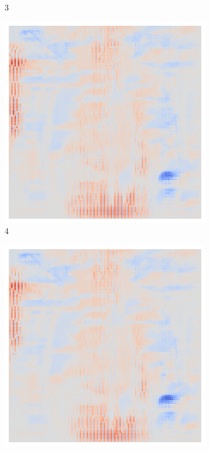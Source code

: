 \begin{figure}[ht!]
\begin{subfigure}{0.095\linewidth}
        \caption{3}
    \end{subfigure}\hfill%
    \begin{subfigure}{0.095\linewidth}
        \centering
        \includegraphics[height=1\linewidth]{01-images/05-resultate/uap_efficientnet/uap0-efficientnetv2m-covid-n200-robustificationslevel4.png}
        \caption{4}
    \end{subfigure}\hfill%
    \begin{subfigure}{0.095\linewidth}
        \centering
        \includegraphics[height=1\linewidth]{01-images/05-resultate/uap_efficientnet/uap0-efficientnetv2m-covid-n200-robustificationslevel5.png}

\end{subfigure}
\end{figure}
